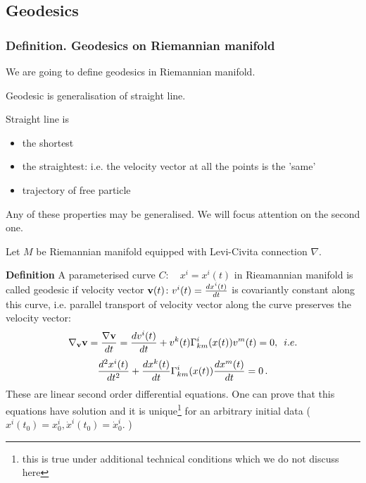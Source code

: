 \documentclass[12pt]{article}
\theoremstyle{theorem}
\numberwithin{equation}{section}
\begin{document}
{\subsection {Geodesics}

\subsubsection {Definition.  Geodesics on 
Riemannian manifold}\label{geodesicsofriem1}




    We are going to define geodesics in Riemannian manifold.

        Geodesic is generalisation of straight line.

           Straight line is

   \begin {itemize}
  
  \item the shortest

   \item the straightest: i.e. the velocity vector at all the points
is the 'same'

   \item trajectory of free particle
  
 \end {itemize}

Any of these properties may be generalised. We will 
  focus attention on the second one.


Let $M$ be Riemannian manifold equipped with 
Levi-Civita connection $\nabla$.

{\bf Definition} A parameterised curve  
$C\colon\quad x^i=x^i(t)$ in Rieamannian manifold
is called geodesic if velocity vector
${\bf v}(t)\colon v^i(t)={dx^i(t)\over dt}$ is covariantly constant along 
this curve, i.e. parallel transport of velocity vector along the curve
preserves the velocity vector:
\begin{equation}\label{geodesdef1}
    \nabla_{\bf v} {\bf v}={\nabla{\bf v}\over dt}={dv^i(t)\over dt}+v^k(t)\Gamma^i_{km}(x(t))v^m(t)=0,\,\,\,{i.e.}
\end{equation}
\begin{equation}\label{geodesdef2}
    {d^2x^i(t)\over dt^2}+{d x^k(t)\over dt}\Gamma^i_{km}(x(t)){d x^m(t)\over dt}=0\,.
\end{equation}
  These are linear second order differential equations. One can prove that
  this equations have solution and it is unique\footnote{this is true under additional technical conditions which we do not
  discuss here} for an arbitrary initial data
  ($x^i(t_0)=x^i_0, \dot x^i(t_0)=\dot x^i_0$. )



}
\end{document}
